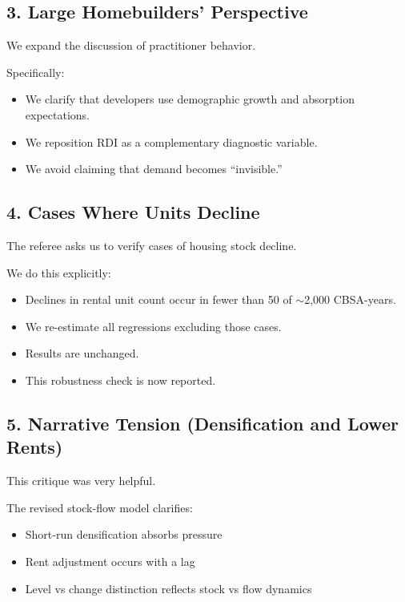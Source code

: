 \documentclass[12pt]{article}
\begin{document}
\subsection*{3. Large Homebuilders' Perspective}

We expand the discussion of practitioner behavior.

Specifically:

\begin{itemize}
\item We clarify that developers use demographic growth and absorption expectations.
\item We reposition RDI as a complementary diagnostic variable.
\item We avoid claiming that demand becomes “invisible.”
\end{itemize}

\subsection*{4. Cases Where Units Decline}

The referee asks us to verify cases of housing stock decline.

We do this explicitly:

\begin{itemize}
\item Declines in rental unit count occur in fewer than 50 of $\sim$2{,}000 CBSA-years.
\item We re-estimate all regressions excluding those cases.
\item Results are unchanged.
\item This robustness check is now reported.
\end{itemize}

\subsection*{5. Narrative Tension (Densification and Lower Rents)}

This critique was very helpful.

The revised stock-flow model clarifies:

\begin{itemize}
\item Short-run densification absorbs pressure
\item Rent adjustment occurs with a lag
\item Level vs change distinction reflects stock vs flow dynamics
\end{itemize}
\end{document}
